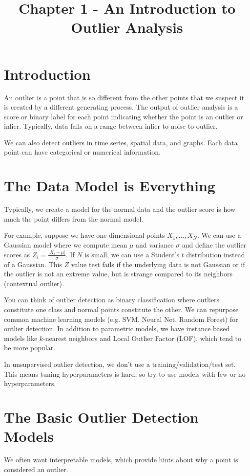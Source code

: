 \documentclass[a4paper]{article}
\title{Chapter 1 - An Introduction to Outlier Analysis}
\date{}
\begin{document}
\maketitle

\section{Introduction}
An outlier is a point that is so different from the other points that we suspect
it is created by a different generating process. The output of outlier analysis
is a score or binary label for each point indicating whether the point is an
outlier or inlier. Typically, data falls on a range between inlier to noise to
outlier.

We can also detect outliers in time series, spatial data, and graphs. Each
data point can have categorical or numerical information.

\section{The Data Model is Everything}
Typically, we create a model for the normal data and the outlier score is how
much the point differs from the normal model.

For example, suppose we have one-dimensional points $X_1, ..., X_N$. We can
use a Gaussian model where we compute mean $\mu$ and variance $\sigma$ and
define the outlier scores as $Z_i = \frac{|X_i - \mu|}{\sigma}$. If $N$ is
small, we can use a Student's $t$ distribution instead of a Gaussian. This
$Z$ value test fails if the underlying data is not Gaussian or if the outlier
is not an extreme value, but is strange compared to its neighbors (contextual
outlier).

You can think of outlier detection as binary classification where outliers
constitute one class and normal points constitute the other. We can repurpose
common machine learning models (e.g. SVM, Neural Net, Random Forest) for
outlier detection. In addition to parametric models,
we have instance based models like $k$-nearest neighbors and Local Outlier
Factor (LOF), which tend to be more popular.

In unsupervised outlier detection, we don't use a training/validation/test
set. This means tuning hyperparameters is hard, so try to use models with few
or no hyperparameters.

\section{The Basic Outlier Detection Models}
We often want interpretable models, which provide hints about why a point is
considered an outlier.
\end{document}
